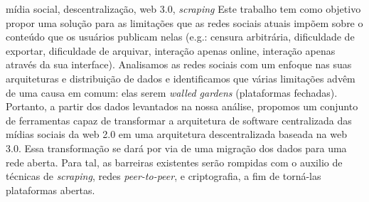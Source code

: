 \documentclass[portuguese,oneside]{tcc}
\begin{document}
\begin{resumo}{mídia social, descentralização, web 3.0, \textit{scraping}}
Este trabalho tem como objetivo propor uma solução para as limitações que as redes sociais atuais impõem sobre o conteúdo que os usuários publicam nelas (e.g.: censura arbitrária, dificuldade de exportar, dificuldade de arquivar, interação apenas online, interação apenas através da sua interface).
Analisamos as redes sociais com um enfoque nas suas arquiteturas e distribuição de dados e identificamos que várias limitações advêm de uma causa em comum: elas serem \textit{walled gardens} (plataformas fechadas).
Portanto, a partir dos dados levantados na nossa análise, propomos um conjunto de ferramentas capaz de transformar a arquitetura de software centralizada das mídias sociais da web 2.0 em uma arquitetura descentralizada baseada na web 3.0.
Essa transformação se dará por via de uma migração dos dados para uma rede aberta.
Para tal, as barreiras existentes serão rompidas com o auxilio de técnicas de \textit{scraping}, redes \textit{peer-to-peer}, e criptografia, a fim de torná-las plataformas abertas.
\end{resumo}

\begin{abstract}{social media, decentralization, web 3.0, scraping}
This paper exposes problems with modern social media and proposes a strategy to mitigate them.
Through an analysis of current social media focused on their data management design decisions, we identified many problems with a common cause: them being walled gardens.
Therefore, we propose, based on the data gathered on our analysis, a set of tools capable of upgrading their centralized web2 software architecture to a decentralized web3-based one.
This upgrade would consist in migrating the data to an open network, tearing down the garden walls.
In order to accomplish that, we will make use of estabilished computer science tools such as webscraping, peer-to-peer networking, and public-key cryptography.
\end{abstract}
\end{document}
